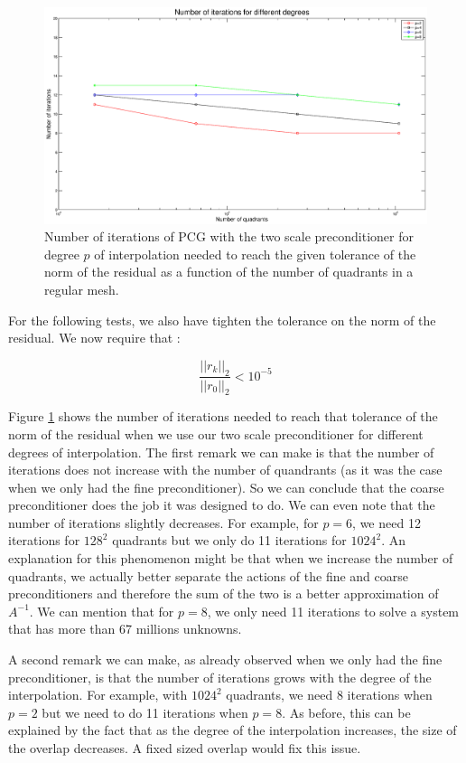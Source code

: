 \begin{figure}
\centering
\includegraphics[scale=0.35]{Results/two_reg_iter.eps}
\caption{Number of iterations of PCG with the two scale preconditioner for degree $p$ of interpolation needed to reach the given tolerance of the norm of the residual as a function of the number of quadrants in a regular mesh.}
\label{two_reg_iter}
\end{figure}

For the following tests, we also have tighten the tolerance on the norm of the residual. We now require that : 

$$\frac{||r_k||_2}{||r_0||_2} < 10^{-5}$$

Figure \ref{two_reg_iter} shows the number of iterations needed to reach that tolerance of the norm of the residual when we use our two scale preconditioner for different degrees of interpolation. The first remark we can make is that the number of iterations does not increase with the number of quandrants (as it was the case when we only had the fine preconditioner). So we can conclude that the coarse preconditioner does the job it was designed to do. We can even note that the number of iterations slightly decreases. For example, for $p=6$, we need 12 iterations for $128^2$ quadrants but we only do 11 iterations for $1024^2$. An explanation for this phenomenon might be that when we increase the number of quadrants, we actually better separate the actions of the fine and coarse preconditioners and therefore the sum of the two is a better approximation of $A^{-1}$. We can mention that for $p=8$, we only need 11 iterations to solve a system that has more than 67 millions unknowns. 

A second remark we can make, as already observed when we only had the fine preconditioner, is that the number of iterations grows with the degree of the interpolation. For example, with $1024^2$ quadrants, we need 8 iterations when $p=2$ but we need to do 11 iterations when $p=8$. As before, this can be explained by the fact that as the degree of the interpolation increases, the size of the overlap decreases. A fixed sized overlap would fix this issue. 

